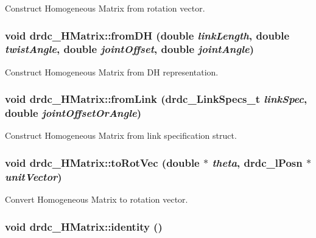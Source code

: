Construct Homogeneous Matrix from rotation vector. 

\hypertarget{classdrdc__HMatrix_a264908dfdd69262c02b7e041ec12f20}{
\subsubsection[fromDH]{\setlength{\rightskip}{0pt plus 5cm}void drdc\_\-HMatrix::fromDH (double {\em linkLength}, \/  double {\em twistAngle}, \/  double {\em jointOffset}, \/  double {\em jointAngle})}}
\label{classdrdc__HMatrix_a264908dfdd69262c02b7e041ec12f20}


Construct Homogeneous Matrix from DH representation. 

\hypertarget{classdrdc__HMatrix_4005e8dacfae57ad94af32c58f69b443}{
\subsubsection[fromLink]{\setlength{\rightskip}{0pt plus 5cm}void drdc\_\-HMatrix::fromLink ({\bf drdc\_\-LinkSpecs\_\-t} {\em linkSpec}, \/  double {\em jointOffsetOrAngle})}}
\label{classdrdc__HMatrix_4005e8dacfae57ad94af32c58f69b443}


Construct Homogeneous Matrix from link specification struct. 

\hypertarget{classdrdc__HMatrix_2eb122e8c6debc51f4c290ce9a3ffbc2}{
\subsubsection[toRotVec]{\setlength{\rightskip}{0pt plus 5cm}void drdc\_\-HMatrix::toRotVec (double $\ast$ {\em theta}, \/  {\bf drdc\_\-lPosn} $\ast$ {\em unitVector})}}
\label{classdrdc__HMatrix_2eb122e8c6debc51f4c290ce9a3ffbc2}


Convert Homogeneous Matrix to rotation vector. 

\hypertarget{classdrdc__HMatrix_47b76fbb959993241a3b00e7bd2ffae5}{
\subsubsection[identity]{\setlength{\rightskip}{0pt plus 5cm}void drdc\_\-HMatrix::identity ()}}
\label{classdrdc__HMatrix_47b76fbb959993241a3b00e7bd2ffae5}


